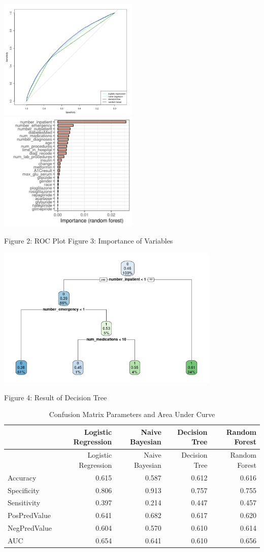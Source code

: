 \documentclass[
]{article}
\begin{document}
\includegraphics[width=0.5\textwidth,height=\textheight]{ROC.png}     
\includegraphics[width=0.5\textwidth,height=\textheight]{Importance_rf.png}

Figure 2: ROC Plot Figure 3: Importance of Variables

\includegraphics[width=0.8\textwidth,height=\textheight]{tuned_decisiontree.png}

Figure 4: Result of Decision Tree

\begin{longtable}[]{@{}lrrrr@{}}
\caption{Confusion Matrix Parameters and Area Under
Curve}\tabularnewline
\toprule()
& Logistic Regression & Naive Bayesian & Decision Tree & Random
Forest \\
\midrule()
\endfirsthead
\toprule()
& Logistic Regression & Naive Bayesian & Decision Tree & Random
Forest \\
\midrule()
\endhead
Accuracy & 0.615 & 0.587 & 0.612 & 0.616 \\
Specificity & 0.806 & 0.913 & 0.757 & 0.755 \\
Sensitivity & 0.397 & 0.214 & 0.447 & 0.457 \\
PosPredValue & 0.641 & 0.682 & 0.617 & 0.620 \\
NegPredValue & 0.604 & 0.570 & 0.610 & 0.614 \\
AUC & 0.654 & 0.641 & 0.610 & 0.656 \\
\bottomrule()
\end{longtable}
\end{document}
